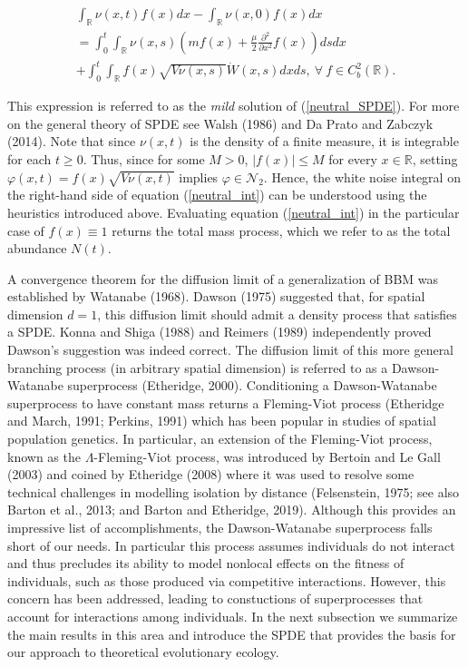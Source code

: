 \documentclass[]{elsarticle} %
\begin{document}
\begin{multline}\label{neutral_int}
\int_\mathbb{R}\nu(x,t)f(x)dx-\int_\mathbb{R}\nu(x,0)f(x)dx\\=\int_0^t\int_\mathbb{R}\nu(x,s)\left(mf(x)+\frac{\mu}{2}\frac{\partial^2}{\partial x^2}f(x)\right)dsdx \\
+\int_0^t\int_\mathbb{R}f(x)\sqrt{V\nu(x,s)}\dot W(x,s)dxds, \ \forall \ f\in C_b^2(\mathbb{R}).
\end{multline}

This expression is referred to as the \emph{mild} solution of
(\ref{neutral_SPDE}). For more on the general theory of SPDE see Walsh
(1986) and Da Prato and Zabczyk (2014). Note that since \(\nu(x,t)\) is
the density of a finite measure, it is integrable for each \(t\geq0\).
Thus, since for some \(M>0\), \(|f(x)|\leq M\) for every
\(x\in\mathbb{R}\), setting \(\varphi(x,t)=f(x)\sqrt{V\nu(x,t)}\)
implies \(\varphi\in\mathscr{N}_2\). Hence, the white noise integral on
the right-hand side of equation (\ref{neutral_int}) can be understood
using the heuristics introduced above. Evaluating equation
(\ref{neutral_int}) in the particular case of \(f(x)\equiv1\) returns
the total mass process, which we refer to as the total abundance
\(N(t)\).

A convergence theorem for the diffusion limit of a generalization of BBM
was established by Watanabe (1968). Dawson (1975) suggested that, for
spatial dimension \(d=1\), this diffusion limit should admit a density
process that satisfies a SPDE. Konna and Shiga (1988) and Reimers (1989)
independently proved Dawson's suggestion was indeed correct. The
diffusion limit of this more general branching process (in arbitrary
spatial dimension) is referred to as a Dawson-Watanabe superprocess
(Etheridge, 2000). Conditioning a Dawson-Watanabe superprocess to have
constant mass returns a Fleming-Viot process (Etheridge and March, 1991;
Perkins, 1991) which has been popular in studies of spatial population
genetics. In particular, an extension of the Fleming-Viot process, known
as the \(\Lambda\)-Fleming-Viot process, was introduced by Bertoin and
Le Gall (2003) and coined by Etheridge (2008) where it was used to
resolve some technical challenges in modelling isolation by distance
(Felsenstein, 1975; see also Barton et al., 2013; and Barton and
Etheridge, 2019). Although this provides an impressive list of
accomplishments, the Dawson-Watanabe superprocess falls short of our
needs. In particular this process assumes individuals do not interact
and thus precludes its ability to model nonlocal effects on the fitness
of individuals, such as those produced via competitive interactions.
However, this concern has been addressed, leading to constuctions of
superprocesses that account for interactions among individuals. In the
next subsection we summarize the main results in this area and introduce
the SPDE that provides the basis for our approach to theoretical
evolutionary ecology.
\end{document}
